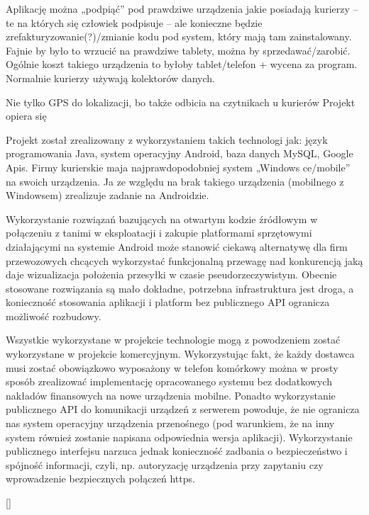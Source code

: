\documentclass[eng,printmode,oneside]{mgr}
\begin{document}
Aplikację można „podpiąć” pod prawdziwe urządzenia jakie posiadają kurierzy – te
na których się człowiek podpisuje – ale konieczne będzie
zrefakturyzowanie(?)/zmianie kodu pod system, który mają tam zainstalowany.
	Fajnie by było to wrzucić na prawdziwe tablety, można by sprzedawać/zarobić.
	Ogólnie koszt takiego urządzenia to byłoby tablet/telefon + wycena za program.
	Normalnie kurierzy używają kolektorów danych.
	
	
 Nie tylko GPS do lokalizacji, bo także odbicia
na czytnikach u kurierów Projekt opiera się 

Projekt został zrealizowany z wykorzystaniem takich
technologi jak: język programowania Java, system operacyjny Android, baza danych
MySQL, Google Apis. Firmy kurierskie maja najprawdopodobniej system „Windows
ce/mobile” na swoich urządzenia. Ja ze względu na brak takiego urządzenia
(mobilnego z Windowsem) zrealizuje zadanie na Androidzie.



Wykorzystanie rozwiązań bazujących na otwartym kodzie źródłowym w połączeniu 
z tanimi w eksploatacji i zakupie platformami sprzętowymi działającymi na systemie 
Android może stanowić ciekawą alternatywę dla firm przewozowych chcących wykorzystać 
funkcjonalną przewagę nad konkurencją jaką daje wizualizacja położenia przesyłki 
w czasie pseudorzeczywistym. Obecnie stosowane rozwiązania są mało dokładne, 
potrzebna infrastruktura jest droga, a konieczność stosowania aplikacji i 
platform bez publicznego API ogranicza możliwość rozbudowy.

Wszystkie wykorzystane w projekcie technologie mogą z powodzeniem zostać wykorzystane
 w projekcie komercyjnym. Wykorzystując fakt, że każdy dostawca musi zostać obowiązkowo
  wyposażony w telefon komórkowy można w prosty sposób zrealizować implementację
   opracowanego systemu bez dodatkowych nakładów finansowych na nowe urządzenia
    mobilne. Ponadto wykorzystanie publicznego API do komunikacji urządzeń z
     serwerem powoduje, że nie ogranicza nas system operacyjny urządzenia
      przenośnego (pod warunkiem, że na inny system również zostanie napisana 
      odpowiednia wersja aplikacji). Wykorzystanie publicznego interfejsu narzuca 
      jednak konieczność zadbania o bezpieczeństwo i spójność informacji, czyli, 
      np. autoryzację urządzenia przy zapytaniu czy wprowadzenie bezpiecznych połączeń https.

\ref{}


\listoffigures
\lstlistoflistings
\end{document}
